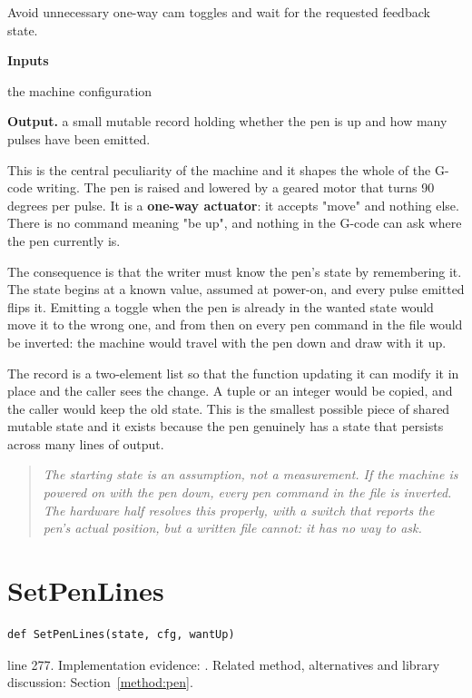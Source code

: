Avoid unnecessary one-way cam toggles and wait for the requested feedback state.




\noindent\textbf{Inputs}
\begin{description}[leftmargin=2.2em,style=nextline,font=\normalfont\ttfamily]\setlength\itemsep{1pt}
  \item[{cfg}] \normalfont the machine configuration
\end{description}

\noindent\textbf{Output.} a small mutable record holding whether the pen is up and how many pulses have been emitted.


This is the central peculiarity of the machine and it shapes the whole of the G-code writing. The pen is raised and lowered by a geared motor that turns 90 degrees per pulse. It is a \textbf{one-way actuator}: it accepts "move" and nothing else. There is no command meaning "be up", and nothing in the G-code can ask where the pen currently is.

The consequence is that the writer must know the pen's state by remembering it. The state begins at a known value, assumed at power-on, and every pulse emitted flips it. Emitting a toggle when the pen is already in the wanted state would move it to the wrong one, and from then on every pen command in the file would be inverted: the machine would travel with the pen down and draw with it up.


The record is a two-element list so that the function updating it can modify it in place and the caller sees the change. A tuple or an integer would be copied, and the caller would keep the old state. This is the smallest possible piece of shared mutable state and it exists because the pen genuinely has a state that persists across many lines of output.


\begin{quote}\small\itshape The starting state is an assumption, not a measurement. If the machine is powered on with the pen down, every pen command in the file is inverted. The hardware half resolves this properly, with a switch that reports the pen's actual position, but a written file cannot: it has no way to ask.\end{quote}


\section{SetPenLines}\label{fn:reproduce:SetPenLines}
\begin{lstlisting}[style=sig]
def SetPenLines(state, cfg, wantUp)
\end{lstlisting}
 line 277. Implementation evidence: \cite{code2026}. Related method, alternatives and library discussion: Section~\ref{method:pen}.


